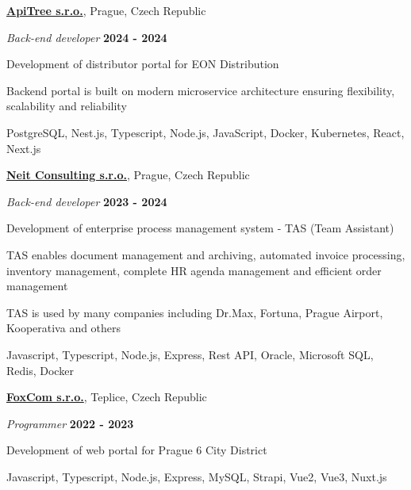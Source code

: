 \documentclass[10pt]{article}
\newenvironment{outerlist}[0]%
        {\begin{itemize}}
	{\end{itemize}
         \vspace{-.6\baselineskip}}
\newenvironment{innerlist}[0]%
        {\begin{compactitem}}
	{\end{compactitem}}
\newcommand{\blankline}{\quad\pagebreak[2]}
\begin{document}
\href{http://www.apitree.cz}{\textbf{ApiTree s.r.o.}}, 
Prague, Czech Republic

\begin{outerlist}
	\item[] \textit{Back-end developer}%
		\hfill \textbf{2024 - 2024}
	\begin{innerlist}
		\item Development of distributor portal for EON Distribution
		\item Backend portal is built on modern microservice architecture ensuring flexibility, scalability and reliability
		\item PostgreSQL, Nest.js, Typescript, Node.js, JavaScript, Docker, Kubernetes, React, Next.js	
	\end{innerlist}
\end{outerlist}
\blankline

\href{http://www.neit.cz}{\textbf{Neit Consulting s.r.o.}}, 
Prague, Czech Republic

\begin{outerlist}
	\item[] \textit{Back-end developer}%
		\hfill \textbf{2023 - 2024}
	\begin{innerlist}
		\item Development of enterprise process management system - TAS (Team Assistant)
		\item TAS enables document management and archiving, automated invoice processing, inventory management, complete HR agenda management and efficient order management
		\item TAS is used by many companies including Dr.Max, Fortuna, Prague Airport, Kooperativa and others
		\item Javascript, Typescript, Node.js, Express, Rest API, Oracle, Microsoft SQL, Redis, Docker	
	\end{innerlist}
\end{outerlist}
\blankline

\href{http://www.foxcom.eu}{\textbf{FoxCom s.r.o.}}, 
Teplice, Czech Republic

\begin{outerlist}
	\item[] \textit{Programmer}%
		\hfill \textbf{2022 - 2023}
	\begin{innerlist}
		\item Development of web portal for Prague 6 City District
		\item Javascript, Typescript, Node.js, Express, MySQL, Strapi, Vue2, Vue3, Nuxt.js
	\end{innerlist}
\end{outerlist}
\blankline
\end{document}

